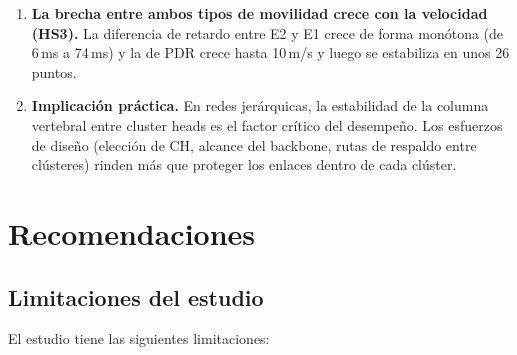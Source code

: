 \begin{enumerate}[label=\arabic*.]
    \item \textbf{La brecha entre ambos tipos de movilidad crece con la velocidad (HS3).}
    La diferencia de retardo entre E2 y E1 crece de forma monótona (de 6\,ms a 74\,ms) y
    la de PDR crece hasta 10\,m/s y luego se estabiliza en unos 26 puntos.

    \item \textbf{Implicación práctica.} En redes jerárquicas, la estabilidad de la
    columna vertebral entre cluster heads es el factor crítico del desempeño. Los
    esfuerzos de diseño (elección de CH, alcance del backbone, rutas de respaldo entre
    clústeres) rinden más que proteger los enlaces dentro de cada clúster.
\end{enumerate}

\section{Recomendaciones}
\label{sec:recomendaciones}

\subsection{Limitaciones del estudio}

El estudio tiene las siguientes limitaciones:

